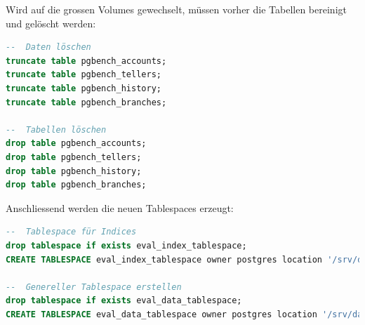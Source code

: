 Wird auf die grossen Volumes gewechselt, müssen vorher die Tabellen bereinigt und gelöscht werden:
\lstset{style=gra_codestyle}
\begin{lstlisting}[language=sql, caption=Patroni - Benchmarking - DB Cleanup,captionpos=b,label={lst:patroni-benchmarking-cleanup},breaklines=true]
--  Daten löschen
truncate table pgbench_accounts;
truncate table pgbench_tellers;
truncate table pgbench_history;
truncate table pgbench_branches;

--  Tabellen löschen
drop table pgbench_accounts;
drop table pgbench_tellers;
drop table pgbench_history;
drop table pgbench_branches;
\end{lstlisting}

Anschliessend werden die neuen Tablespaces erzeugt:
\lstset{style=gra_codestyle}
\begin{lstlisting}[language=sql, caption=Patroni - Benchmarking - Tablespaces erneut erstellen,captionpos=b,label={lst:patroni-benchmarking-recreate-tablespaces},breaklines=true]
--  Tablespace für Indices
drop tablespace if exists eval_index_tablespace;
CREATE TABLESPACE eval_index_tablespace owner postgres location '/srv/data/eval_index_tablespace';

--  Genereller Tablespace erstellen
drop tablespace if exists eval_data_tablespace;
CREATE TABLESPACE eval_data_tablespace owner postgres location '/srv/data/eval_data_tablespace';
\end{lstlisting}
